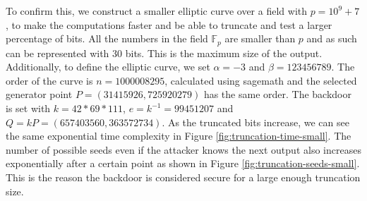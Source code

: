 To confirm this, we construct a smaller elliptic curve over a field with $p = 10^9 + 7$, to make the computations faster and be able to truncate and test a larger percentage of bits. All the numbers in the field $\mathbb{F}_p$ are smaller than $p$ and as such can be represented with $30$ bits. This is the maximum size of the output.
\\

Additionally, to define the elliptic curve, we set $\alpha = -3$ and $\beta = 123456789$. The order of the curve is $n = 1000008295$, calculated using sagemath \cite{sagemath} and the selected generator point $P = (31415926, 725920279)$ has the same order. The backdoor is set with $k = 42 * 69 * 111$, $e = k^{-1} = 99451207$ and $Q = kP = (657403560, 363572734)$. As the truncated bits increase, we can see the same exponential time complexity in Figure \ref{fig:truncation-time-small}. The number of possible seeds even if the attacker knows the next output also increases exponentially after a certain point as shown in Figure \ref{fig:truncation-seeds-small}. This is the reason the backdoor is considered secure for a large enough truncation size.

